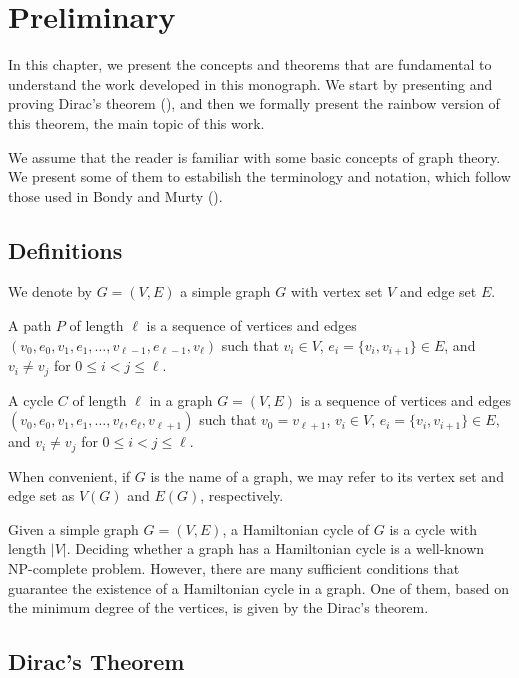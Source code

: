 
\chapter{Preliminary}

In this chapter, we present the concepts and theorems that are fundamental to understand the 
work developed in this monograph. We start by presenting and proving Dirac's theorem
(\cite{dirac1952}), 
and then we formally present the rainbow version of this theorem, the main topic of this work.

We assume that the reader is familiar with some basic concepts of graph theory. We present some 
of them to estabilish the terminology and notation, which follow those used in Bondy and Murty 
(\cite{bondy1976}).

\section{Definitions}

We denote by $G = (V, E)$ a simple graph $G$ with vertex set $V$ and edge set $E$.

A path $P$ of length $\ell$ is a sequence of vertices and edges $(v_0, e_0, v_1, e_1, \ldots, v_{\ell - 1}, e_{\ell - 1}, v_{\ell})$ such that
$v_i \in V$, $e_i = \{v_i, v_{i + 1}\} \in E$, and $v_i \neq v_j$ for $0 \leq i < j \leq \ell$.

A cycle $C$ of length $\ell$ in a graph $G = (V, E)$ is a sequence of vertices and edges $(v_0, e_0, v_1, e_1, \ldots, v_{\ell}, e_{\ell}, v_{\ell + 1})$ such that
$v_{0} = v_{\ell + 1}$, $v_i \in V$, $e_i = \{v_i, v_{i + 1}\} \in E$, and $v_i \neq v_j$ for $0 \leq i < j \leq \ell$.

When convenient, if $G$ is the name of a graph, we may refer to its vertex set and edge set as $V(G)$ and $E(G)$, respectively.

Given a simple graph $G = (V, E)$, a Hamiltonian cycle of $G$ is a cycle with length $|V|$.
Deciding whether a graph has a Hamiltonian cycle is a well-known NP-complete problem. 
However, there are many sufficient conditions that guarantee the existence of a Hamiltonian cycle in a graph. 
One of them, based on the minimum degree of the vertices, is given by the Dirac's theorem.

\section{Dirac's Theorem}

